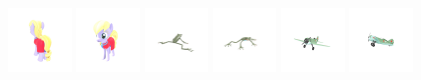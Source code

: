 \begin{figure}[htbp]
  \includegraphics[width=0.15\textwidth]{images/data/samples/7.1.jpeg}\hspace{0.01\textwidth}%
  \includegraphics[width=0.15\textwidth]{images/data/samples/7.2.jpeg}\hfill
  \includegraphics[width=0.15\textwidth]{images/data/samples/8.1.jpeg}\hspace{0.01\textwidth}%
  \includegraphics[width=0.15\textwidth]{images/data/samples/8.2.jpeg}\hfill
  \includegraphics[width=0.15\textwidth]{images/data/samples/9.1.jpeg}\hspace{0.01\textwidth}%
  \includegraphics[width=0.15\textwidth]{images/data/samples/9.2.jpeg}\\
  \vspace{2mm}


\end{figure}
